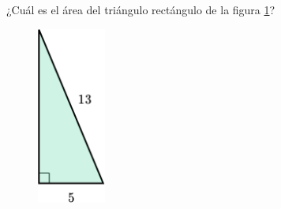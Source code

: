 ¿Cuál es el área del triángulo rectángulo de la figura \ref{fig:area_rectangulo_03}?
\begin{figure}[H]
    \begin{center}
        \includegraphics[width=0.2\textwidth]{../images/area_rectangulo_03.png}
    \end{center}
    \caption{}
    \label{fig:area_rectangulo_03}
\end{figure}